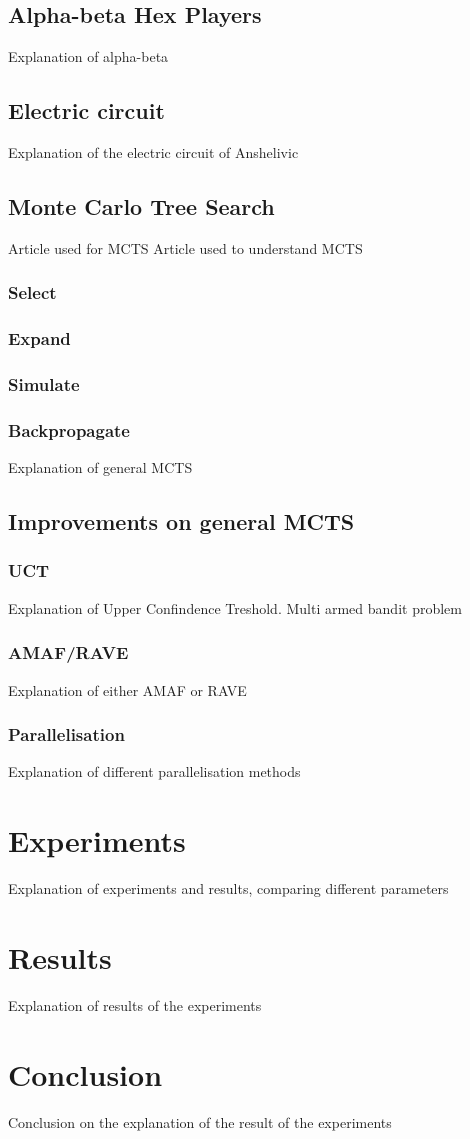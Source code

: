 \documentclass{ba-kecs}
\begin{document}
\subsection{Alpha-beta Hex Players}
Explanation of alpha-beta 
\subsection{Electric circuit}
Explanation of the electric circuit of Anshelivic
\subsection{Monte Carlo Tree Search}
Article used for MCTS \cite{arneson2010monte}
Article used to understand MCTS \cite{browne2012survey}
\subsubsection{Select}
\subsubsection{Expand}
\subsubsection{Simulate}
\subsubsection{Backpropagate}
Explanation of general MCTS
\subsection{Improvements on general MCTS}
\subsubsection{UCT}
Explanation of Upper Confindence Treshold. Multi armed bandit problem
\subsubsection{AMAF/RAVE}

Explanation of either AMAF or RAVE \cite{gelly2011monte}
\subsubsection{Parallelisation}
Explanation of different parallelisation methods

\section{Experiments}
Explanation of experiments and results, comparing different parameters
\section{Results}
Explanation of results of the experiments
\section{Conclusion}
Conclusion on the explanation of the result of the experiments

\end{document}

